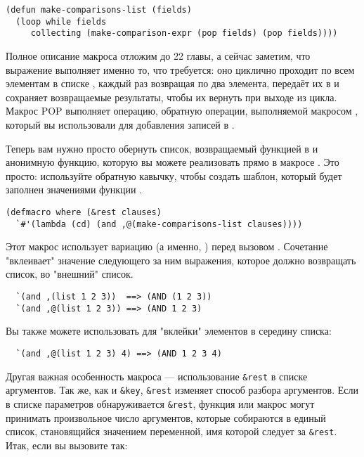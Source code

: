 \begin{lstlisting}
(defun make-comparisons-list (fields)
  (loop while fields
     collecting (make-comparison-expr (pop fields) (pop fields))))
\end{lstlisting}

Полное описание макроса  отложим до 22 главы, а сейчас заметим, что выражение
 выполняет именно то, что требуется: оно циклично проходит по всем элементам в
списке , каждый раз возвращая по два элемента, передаёт их в
 и сохраняет возвращаемые результаты, чтобы их вернуть при
выходе из цикла. Макрос POP выполняет операцию, обратную операции, выполняемой макросом
, который вы использовали для добавления записей в .

Теперь вам нужно просто обернуть список, возвращаемый функцией 
в  и анонимную функцию, которую вы можете реализовать прямо в макросе
. Это просто: используйте обратную кавычку, чтобы создать шаблон, который
будет заполнен значениями функции .

\begin{lstlisting}
(defmacro where (&rest clauses)
  `#'(lambda (cd) (and ,@(make-comparisons-list clauses))))
\end{lstlisting}

Этот макрос использует вариацию \code{,} (а именно, ) перед вызовом
. Сочетание  "вклеивает" значение следующего за ним
выражения, которое должно возвращать список, во "внешний" список.

\begin{verbatim}
  `(and ,(list 1 2 3))  ==> (AND (1 2 3))
  `(and ,@(list 1 2 3)) ==> (AND 1 2 3)
\end{verbatim}

Вы также можете использовать  для "вклейки" элементов в середину списка:

\begin{verbatim}
  `(and ,@(list 1 2 3) 4) ==> (AND 1 2 3 4)
\end{verbatim}

Другая важная особенность макроса  --- использование \lstinline{&rest} в списке
аргументов. Так же, как и \lstinline!&key!, \lstinline{&rest} изменяет способ разбора
аргументов. Если в списке параметров обнаруживается \lstinline{&rest}, функция или макрос могут
принимать произвольное число аргументов, которые собираются в единый список, становящийся
значением переменной, имя которой следует за \lstinline{&rest}. Итак, если вы вызовите
 так:

